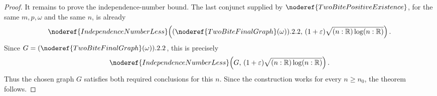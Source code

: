 \begin{proof}
It remains to prove the independence-number bound.  The last conjunct supplied
by \(\noderef{TwoBitePositiveExistence}\), for the same \(m,p,\omega\) and the
same \(n\), is already
\[
\noderef{IndependenceNumberLess}\!\left(
(\noderef{TwoBiteFinalGraph}(\omega)).2.2,\,
(1+\varepsilon)\sqrt{(n:\mathbb R)\log(n:\mathbb R)}\right).
\]
Since \(G=(\noderef{TwoBiteFinalGraph}(\omega)).2.2\), this is precisely
\[
\noderef{IndependenceNumberLess}\!\left(
G,\,(1+\varepsilon)\sqrt{(n:\mathbb R)\log(n:\mathbb R)}\right).
\]
Thus the chosen graph \(G\) satisfies both required conclusions for this
\(n\).  Since the construction works for every \(n\ge n_0\), the theorem
follows.
\end{proof}
